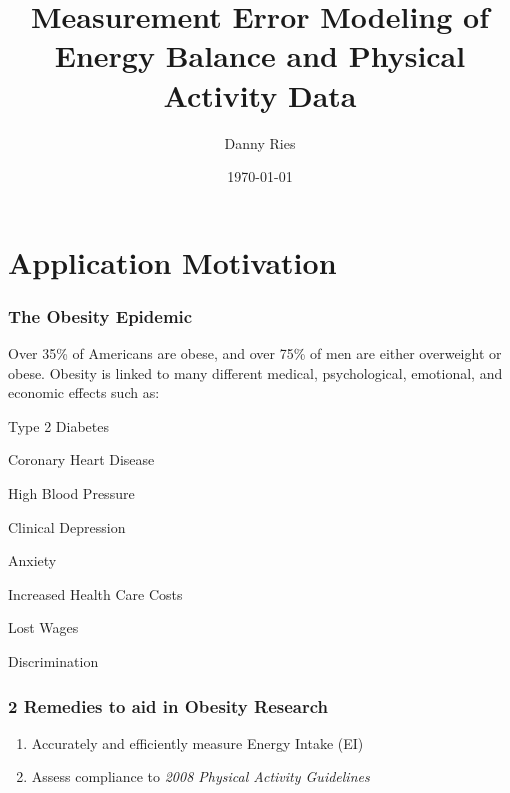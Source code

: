 \documentclass[handout]{beamer}\usepackage[]{graphicx}\usepackage[]{color}
\title{Measurement Error Modeling of Energy Balance and Physical Activity Data}
\author[Danny Ries]{Danny Ries}
\institute[Iowa State]{Iowa State University}
\date{\today}
\begin{document}







\frame{\maketitle}

\section{Application Motivation}
\begin{frame}
\frametitle{The Obesity Epidemic}

Over 35\% of Americans are obese, and over  75\% of men are either overweight or obese. Obesity is linked to many different medical, psychological, emotional, and economic effects such as:
\begin{itemize}
\begin{multicols}{2}
\item
Type 2 Diabetes
\item
Coronary Heart Disease
\item
High Blood Pressure
\item 
Clinical Depression
\columnbreak
\item
Anxiety
\item 
Increased Health Care Costs
\item
Lost Wages
\item
Discrimination
\end{multicols}
\end{itemize}

\end{frame}






\begin{frame}
\frametitle{2 Remedies to aid in Obesity Research}
\begin{enumerate}
\item
Accurately and efficiently measure Energy Intake (EI)

\vspace{0.2cm}

\item
Assess compliance to \emph{2008 Physical Activity Guidelines}
\end{enumerate}



\end{frame}
\end{document}

